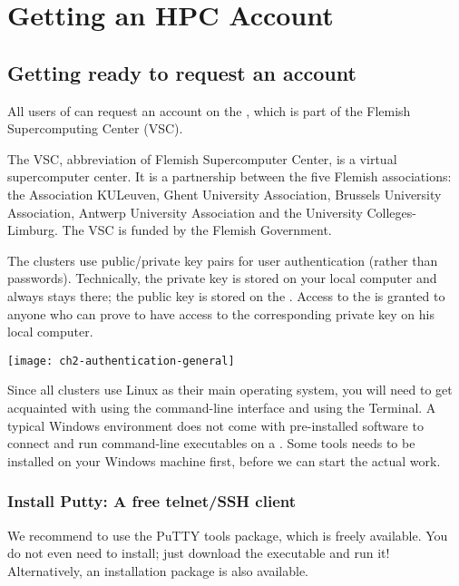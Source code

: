 \chapter{Getting an HPC Account}
\label{ch:getting-a-hpc-account}

\section{Getting ready to request an account}
\label{sec:getting-ready-to-request-an-account}

All users of \association can request an account on
the \hpc, which is part of the Flemish Supercomputing Center (VSC).

The VSC, abbreviation of Flemish Supercomputer Center, is a virtual
supercomputer center. It is a partnership between the five Flemish
associations: the Association KULeuven,  Ghent University Association, Brussels
University Association, Antwerp University Association and the University
Colleges-Limburg. The VSC is funded by the Flemish Government.

The \hpc clusters use public/private key pairs for user authentication
(rather than passwords). Technically, the private key is stored on your local
computer and always stays there; the public key is stored on the \hpc.
Access to the \hpc is granted to anyone who can prove to have access to the
corresponding private key on his local computer.

\texttt{[image: ch2-authentication-general]}

\ifwindows

  Since all \hpc clusters use Linux as their main operating system, you will
  need to get acquainted with using the command-line interface and using the
  Terminal. A typical Windows environment does not come with pre-installed
  software to connect and run command-line executables on a \hpc. Some tools
  needs to be installed on your Windows machine first, before we can start the
  actual work.

  \subsection{Install Putty: A free telnet/SSH client}
  \label{sec:install-putty}

  We recommend to use the PuTTY tools package, which is freely available. You
  do not even need to install; just download the executable and run it!
  Alternatively, an installation package is also available.

